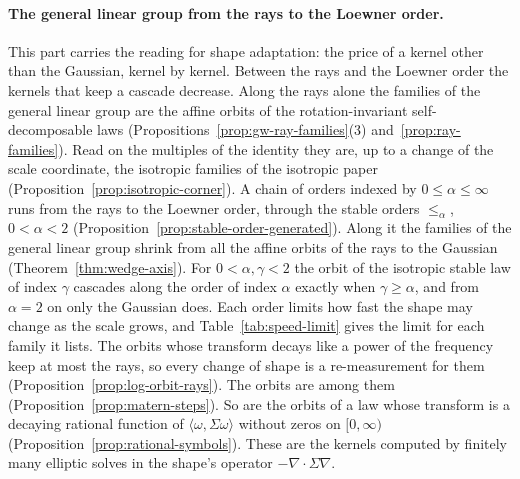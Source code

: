 \paragraph{The general linear group from the rays to the Loewner order.} This part carries the reading
for shape adaptation: the price of a kernel other than the Gaussian, kernel by kernel. Between the rays
and the Loewner order the kernels that keep a cascade decrease. Along the rays alone the families of
the general linear group are the affine orbits of the rotation-invariant self-decomposable laws
(Propositions~\ref{prop:gw-ray-families}(3) and~\ref{prop:ray-families}). Read on the multiples of the identity they are, up to a change
of the scale coordinate, the isotropic families of the isotropic paper
(Proposition~\ref{prop:isotropic-corner}). A chain of orders indexed by $0 \le \alpha \le \infty$ runs
from the rays to the Loewner order, through the stable orders $\le_\alpha$, $0 < \alpha < 2$
(Proposition~\ref{prop:stable-order-generated}). Along it the families of the general linear group
shrink from all the affine orbits of the rays to the Gaussian (Theorem~\ref{thm:wedge-axis}). For
$0 < \alpha, \gamma < 2$ the orbit of the isotropic stable law of index $\gamma$ cascades along the
order of index $\alpha$ exactly when $\gamma \ge \alpha$, and from $\alpha = 2$ on only the Gaussian does.
Each order limits how fast the shape may change as the scale grows, and Table~\ref{tab:speed-limit} gives
the limit for each family it lists. The orbits whose transform decays like a power of the frequency keep at
most the rays, so every change of shape is a re-measurement for them
(Proposition~\ref{prop:log-orbit-rays}). The \Matern{} orbits are among them
(Proposition~\ref{prop:matern-steps}). So are the orbits of a law whose transform is a decaying
rational function of $\langle\omega,\Sigma\omega\rangle$ without zeros on $[0,\infty)$
(Proposition~\ref{prop:rational-symbols}). These are the kernels computed by finitely many elliptic
solves in the shape's operator $-\nabla\cdot\Sigma\nabla$.

